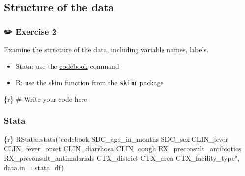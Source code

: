 \documentclass[
  letterpaper,
  DIV=11,
  numbers=noendperiod,
  oneside]{scrreprt}
\newenvironment{Shaded}{\begin{snugshade}}{\end{snugshade}}
\newcommand{\AttributeTok}[1]{\textcolor[rgb]{0.40,0.45,0.13}{#1}}
\newcommand{\CommentTok}[1]{\textcolor[rgb]{0.37,0.37,0.37}{#1}}
\newcommand{\FunctionTok}[1]{\textcolor[rgb]{0.28,0.35,0.67}{#1}}
\newcommand{\InformationTok}[1]{\textcolor[rgb]{0.37,0.37,0.37}{#1}}
\newcommand{\NormalTok}[1]{\textcolor[rgb]{0.00,0.23,0.31}{#1}}
\newcommand{\SpecialCharTok}[1]{\textcolor[rgb]{0.37,0.37,0.37}{#1}}
\newcommand{\StringTok}[1]{\textcolor[rgb]{0.13,0.47,0.30}{#1}}
\providecommand{\tightlist}{%
  \setlength{\itemsep}{0pt}\setlength{\parskip}{0pt}}\usepackage{longtable,booktabs,array}
\begin{document}
\hypertarget{structure-of-the-data-1}{%
\subsection{Structure of the data}\label{structure-of-the-data-1}}

\subsubsection{\texorpdfstring{{✏️} Exercise 2}{✏️ Exercise 2}}

Examine the structure of the data, including variable names, labels.

\begin{tcolorbox}[enhanced jigsaw, coltitle=black, opacityback=0, title=\textcolor{quarto-callout-tip-color}{\faLightbulb}\hspace{0.5em}{Tip}, toprule=.15mm, bottomtitle=1mm, colbacktitle=quarto-callout-tip-color!10!white, colframe=quarto-callout-tip-color-frame, left=2mm, opacitybacktitle=0.6, bottomrule=.15mm, arc=.35mm, toptitle=1mm, colback=white, titlerule=0mm, breakable, leftrule=.75mm, rightrule=.15mm]

\begin{itemize}
\tightlist
\item
  Stata: use the
  \href{https://www.stata.com/manuals/dcodebook.pdf}{codebook} command
\item
  R: use the
  \href{https://docs.ropensci.org/skimr/reference/skim.html}{skim}
  function from the \texttt{skimr} package
\end{itemize}

\end{tcolorbox}

\begin{Shaded}
\begin{Highlighting}[]
\InformationTok{\textasciigrave{}\textasciigrave{}\textasciigrave{}\{r\}}
\CommentTok{\# Write your code here}
\InformationTok{\textasciigrave{}\textasciigrave{}\textasciigrave{}}
\end{Highlighting}
\end{Shaded}

\subsubsection{Stata}

\begin{Shaded}
\begin{Highlighting}[]
\InformationTok{\textasciigrave{}\textasciigrave{}\textasciigrave{}\{r\}}
\NormalTok{RStata}\SpecialCharTok{::}\FunctionTok{stata}\NormalTok{(}\StringTok{"codebook SDC\_age\_in\_months SDC\_sex CLIN\_fever CLIN\_fever\_onset CLIN\_diarrhoea CLIN\_cough RX\_preconsult\_antibiotics RX\_preconsult\_antimalarials CTX\_district CTX\_area CTX\_facility\_type"}\NormalTok{,}
              \AttributeTok{data.in =}\NormalTok{ stata\_df)}
\InformationTok{\textasciigrave{}\textasciigrave{}\textasciigrave{}}
\end{Highlighting}
\end{Shaded}
\end{document}

